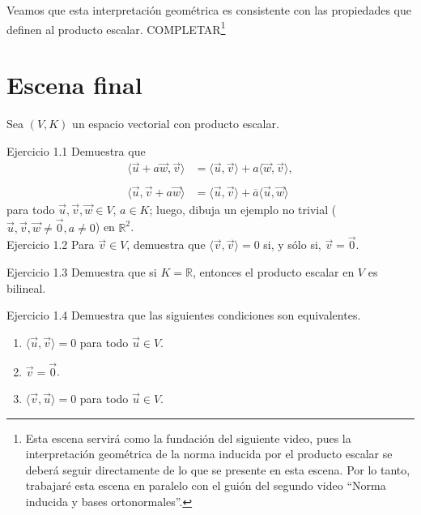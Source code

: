 \documentclass[12pt,dvipsnames]{article}
\numberwithin{equation}{section}
\begin{document}
Veamos que esta interpretación geométrica es consistente con las propiedades que definen al producto escalar. COMPLETAR\footnote{Esta escena servirá como la fundación del siguiente video, pues la interpretación geométrica de la norma inducida por el producto escalar se deberá seguir directamente de lo que se presente en esta escena. Por lo tanto, trabajaré esta escena en paralelo con el guión del segundo video ``Norma inducida y bases ortonormales''.}



\newpage
\section{Escena final}

\begin{center}
    Sea $(V,K)$ un espacio vectorial con producto escalar.
\end{center}

Ejercicio 1.1 Demuestra que %
\begin{align*}
    \langle \vec{u} + a\vec{w}, \vec{v}\rangle &= \langle \vec{u},\vec{v}\rangle + a\langle \vec{w}, \vec{v}\rangle, \\
    \\
    \langle \vec{u}, \vec{v} + a\vec{w}\rangle &= \langle \vec{u},\vec{v}\rangle + \overline{a}\langle \vec{u}, \vec{w}\rangle
\end{align*} para todo $\vec{u},\vec{v},\vec{w}\in V$, $a\in K$; luego, dibuja un ejemplo no trivial ($\vec{u},\vec{v},\vec{w}\neq\vec{0}, a\neq 0$) en $\mathbb{R}^2$. \\

Ejercicio 1.2 Para $\vec{v}\in V$, demuestra que $\langle \vec{v} , \vec{v} \rangle = 0$ si, y sólo si, $\vec{v}=\vec{0}$.

Ejercicio 1.3 Demuestra que si $K=\mathbb{R}$, entonces el producto escalar en $V$ es bilineal.

Ejercicio 1.4 Demuestra que las siguientes condiciones son equivalentes. %

\begin{enumerate}[label=(\alph*)]
    \item $\langle \vec{u} , \vec{v} \rangle = 0$ para todo $\vec{u}\in V$.

    \item $\vec{v}=\vec{0}$.

    \item $\langle \vec{v} , \vec{u} \rangle = 0$ para todo $\vec{u}\in V$.
\end{enumerate}
\end{document}
